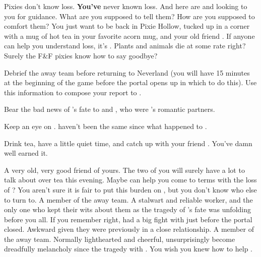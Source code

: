 \documentclass[char]{PP}
\begin{document}
Pixies don't know loss. \textbf{You've} never known loss. And here are \cELove{} and \cMChange{} looking to you for guidance. What are you supposed to tell them? How are you supposed to comfort them? You just want to be back in Pixie Hollow, tucked up in a corner with a mug of hot tea in your favorite acorn mug, and your old friend \cFHead{}. If anyone can help you understand loss, it's \cFHead{}. Plants and animals die at some rate right? Surely the F&F pixies know how to say goodbye?

\begin{itemz}
	\item Debrief the away team before returning to Neverland (you will have 15 minutes at the beginning of the game before the portal opens up in which to do this). Use this information to compose your report to \cSHead{}.
	\item Bear the bad news of \cFLost{}'s fate to \cFButterfly{} and \cMHead{}, who were \cFLost{}'s romantic partners.
	\item Keep an eye on \cMChange{}. \cMChange{\They} haven't been the same since what happened to \cFLost{}.
	\item Drink tea, have a little quiet time, and catch up with your friend \cFHead{}. You've damn well earned it.
\end{itemz}

\begin{itemz}[Notes]
	\item 
\end{itemz}

\begin{contacts}
	\contact{\cFHead{}} A very old, very good friend of yours. The two of you will surely have a lot to talk about over tea this evening. Maybe \cFHead{} can help you come to terms with the loss of \cFLost{}? You aren't sure it is fair to put this burden on \cFHead{}, but you don't know who else to turn to.
	\contact{\cELove{}} A member of the away team. A stalwart and reliable worker, and the only one who kept their wits about them as the tragedy of \cFLost{}'s fate was unfolding before you all. If you remember right, \cELove{} had a big fight with \cEHead{} just before the portal closed. Awkward given they were previously in a close relationship.
	\contact{\cMChange{}} A member of the away team. Normally lighthearted and cheerful, \cMChange{\They} \cMChange{\have} unsurprisingly become dreadfully melancholy since the tragedy with \cFLost{}. You wish you knew how to help \cMChange{\them}.
\end{contacts}
\end{document}
